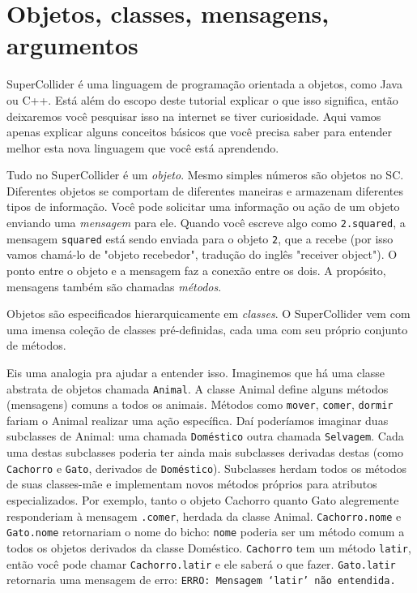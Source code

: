 \section{Objetos, classes, mensagens, argumentos}

SuperCollider é uma linguagem de programação orientada a objetos, como Java ou C++. Está além do escopo deste tutorial explicar o que isso significa, então deixaremos você pesquisar isso na internet se tiver curiosidade. Aqui vamos apenas explicar alguns conceitos básicos que você precisa saber para entender melhor esta nova linguagem que você está aprendendo.

Tudo no SuperCollider é um \emph{objeto}. Mesmo simples números são objetos no SC. Diferentes objetos se comportam de diferentes maneiras e armazenam diferentes tipos de informação. Você pode solicitar uma informação ou ação de um objeto enviando uma \emph{mensagem} para ele. Quando você escreve algo como \texttt{2.squared}, a mensagem \texttt{squared} está sendo enviada para o objeto \texttt{2}, que a recebe (por isso vamos chamá-lo de "objeto recebedor", tradução do inglês "receiver object"). O ponto entre o objeto e a mensagem faz a conexão entre os dois. A propósito, mensagens também são chamadas \emph{métodos}.

Objetos são especificados hierarquicamente em \emph{classes}. O SuperCollider vem com uma imensa coleção de classes pré-definidas, cada uma com seu próprio conjunto de métodos. 

Eis uma analogia pra ajudar a entender isso. Imaginemos que há uma classe abstrata de objetos chamada \texttt{Animal}. A classe Animal define alguns métodos (mensagens) comuns a todos os animais. Métodos como \texttt{mover}, \texttt{comer}, \texttt{dormir} fariam o Animal realizar uma ação específica. Daí poderíamos imaginar duas subclasses de Animal: uma chamada \texttt{Doméstico} outra chamada \texttt{Selvagem}. Cada uma destas subclasses poderia ter ainda mais subclasses derivadas destas (como \texttt{Cachorro} e \texttt{Gato}, derivados de \texttt{Doméstico}). Subclasses herdam todos os métodos de suas classes-mãe e implementam novos métodos próprios para atributos especializados. Por exemplo, tanto o objeto Cachorro quanto Gato alegremente responderiam à mensagem \texttt{.comer}, herdada da classe Animal. \texttt{Cachorro.nome} e \texttt{Gato.nome} retornariam o nome do bicho: \texttt{nome} poderia ser um método comum a todos os objetos derivados da classe Doméstico. \texttt{Cachorro} tem um método \texttt{latir}, então você pode chamar \texttt{Cachorro.latir} e ele saberá o que fazer. \texttt{Gato.latir} retornaria uma mensagem de erro: \texttt{ERRO: Mensagem ‘latir’ não entendida.}

